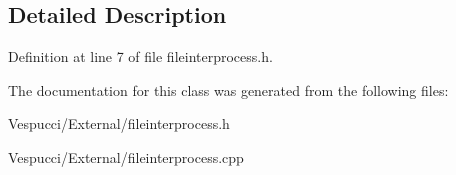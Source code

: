 \subsection{Detailed Description}


Definition at line 7 of file fileinterprocess.\+h.



The documentation for this class was generated from the following files\+:\begin{DoxyCompactItemize}
\item 
Vespucci/\+External/fileinterprocess.\+h\item 
Vespucci/\+External/fileinterprocess.\+cpp\end{DoxyCompactItemize}
